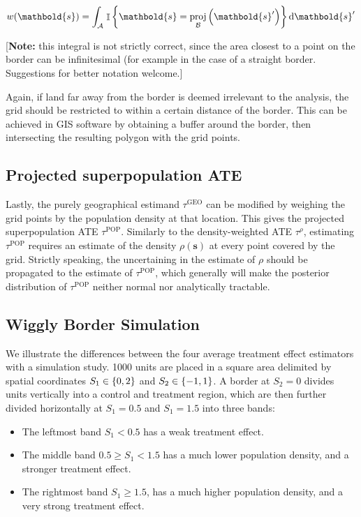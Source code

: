 \documentclass[letter]{article}
\providecommand{\tightlist}{%
      \setlength{\itemsep}{0pt}\setlength{\parskip}{0pt}}
\DeclareMathOperator{\Ind}{\mathbb{I}}
\newcommand{\area}{\mathcal{A}}
\newcommand{\svec}{\mathbold{s}}
\newcommand{\boundary}{\mathcal{B}}
\newcommand{\taurho}{\tau^{\rho}}
\newcommand{\taugeo}{\tau^{\mathrm{GEO}}}
\newcommand{\taupop}{\tau^{\mathrm{POP}}}
\DeclareMathOperator{\proj}{proj}
\providecommand{\tightlist}{%
  	  \setlength{\itemsep}{0pt}\setlength{\parskip}{0pt}}
\begin{document}
\begin{equation}
w(\svec) = \int_{\area} \left. \Ind \cbr{\svec = \proj_{\boundary}\del{\svec'}} \dif \svec' \right.
\end{equation}

{[}\textbf{Note:} this integral is not strictly correct, since the area closest to a point on the border can be infinitesimal (for example in the case of a straight border. Suggestions for better notation welcome.{]}

Again, if land far away from the border is deemed irrelevant to the analysis, the grid should be restricted to within a certain distance of the border.
This can be achieved in GIS software by obtaining a buffer around the border, then intersecting the resulting polygon with the grid points.
    


    	\subsection{Projected superpopulation ATE}\label{projected-superpopulation-ate}

Lastly, the purely geographical estimand \(\taugeo\) can be modified by weighing the grid points by the population density at that location.
This gives the projected superpopulation ATE \(\taupop\).
Similarly to the density-weighted ATE \(\taurho\), estimating \(\taupop\) requires an estimate of the density \(\rho(\svec)\) at every point covered by the grid.
Strictly speaking, the uncertaining in the estimate of \(\rho\) should be propagated to the estimate of \(\taupop\), which generally will make the posterior distribution of \(\taupop\) neither normal nor analytically tractable.
    


    	\subsection{Wiggly Border Simulation}\label{wiggly-border-simulation}

We illustrate the differences between the four average treatment effect estimators with a simulation study.
1000 units are placed in a square area delimited by spatial coordinates \(S_1 \in \cbr{0,2}\) and \(S_2 \in \cbr{-1, 1}\).
A border at \(S_2=0\) divides units vertically into a control and treatment region,
which are then further divided horizontally at \(S_1=0.5\) and \(S_1=1.5\) into three bands:

\begin{itemize}
\tightlist
\item
  The leftmost band \(S_1 < 0.5\) has a weak treatment effect.
\item
  The middle band \(0.5 \ge S_1 < 1.5\) has a much lower population density, and a stronger treatment effect.
\item
  The rightmost band \(S_1 \ge 1.5\), has a much higher population density, and a very strong treatment effect.
\end{itemize}
\end{document}
